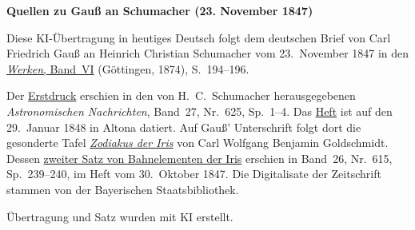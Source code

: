 \clearpage\thispagestyle{empty}
\begin{center}\textbf{Quellen zu Gauß an Schumacher (23. November 1847)}\end{center}
\noindent Diese KI-Übertragung in heutiges Deutsch folgt dem deutschen Brief von Carl Friedrich Gauß an Heinrich Christian Schumacher vom 23.~November 1847 in den \href{https://gdz.sub.uni-goettingen.de/id/PPN236007467}{\textit{Werken}, Band~VI} (Göttingen, 1874), S.~194--196.
\par\smallskip\noindent Der \href{https://api.digitale-sammlungen.de/iiif/image/v2/bsb10049452_00009/full/1450,/0/default.jpg}{Erstdruck} erschien in den von H.~C.~Schumacher herausgegebenen \textit{Astronomischen Nachrichten}, Band~27, Nr.~625, Sp.~1--4. Das \href{https://api.digitale-sammlungen.de/iiif/image/v2/bsb10049452_00016/full/1450,/0/default.jpg}{Heft} ist auf den 29.~Januar 1848 in Altona datiert. Auf Gauß’ Unterschrift folgt dort die gesonderte Tafel \href{https://api.digitale-sammlungen.de/iiif/image/v2/bsb10049452_00010/full/1450,/0/default.jpg}{\textit{Zodiakus der Iris}} von Carl Wolfgang Benjamin Goldschmidt. Dessen \href{https://api.digitale-sammlungen.de/iiif/image/v2/bsb10049451_00128/full/1450,/0/default.jpg}{zweiter Satz von Bahnelementen der Iris} erschien in Band~26, Nr.~615, Sp.~239--240, im Heft vom 30.~Oktober 1847. Die Digitalisate der Zeitschrift stammen von der Bayerischen Staatsbibliothek.
\par\smallskip\noindent Übertragung und Satz wurden mit KI erstellt.
\clearpage
